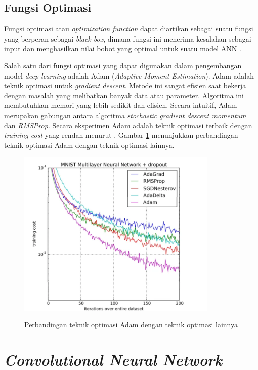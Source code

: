    

\subsection{Fungsi Optimasi}

\par Fungsi optimasi atau \textit{optimization function} dapat diartikan sebagai suatu fungsi yang berperan sebagai \textit{black box}, dimana fungsi ini menerima kesalahan sebagai input dan menghasilkan nilai bobot yang optimal untuk suatu model ANN \citep{li2017learning}.

\par Salah satu dari fungsi optimasi yang dapat digunakan dalam pengembangan model \textit{deep learning} adalah Adam (\textit{Adaptive Moment Estimation}). Adam adalah teknik optimasi untuk \textit{gradient descent}. Metode ini sangat efisien saat bekerja dengan masalah yang melibatkan banyak data atau parameter. Algoritma ini membutuhkan memori yang lebih sedikit dan efisien. Secara intuitif, Adam merupakan gabungan antara algoritma \textit{stochastic gradient descent momentum} dan \textit{RMSProp}. Secara eksperimen Adam adalah teknik optimasi terbaik dengan \textit{training cost} yang rendah menurut \citep{kingma2014adam}. Gambar \ref{fig:adam} menunjukkan perbandingan teknik optimasi Adam dengan teknik optimasi lainnya.

\begin{figure}[H]
    \centering
    {\includegraphics [width=\textwidth,height=8cm]{image/bab2/graf-optimisasi}}
    \caption{Perbandingan teknik optimasi Adam dengan teknik optimasi lainnya \citep{kingma2014adam}}
    \label{fig:adam}
\end{figure}


\section{\textit{Convolutional Neural Network}}

